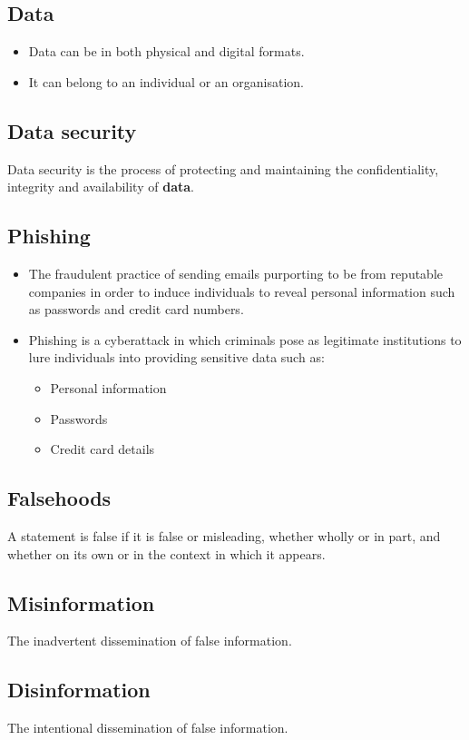 \documentclass[11pt]{article}
\begin{document}
\subsection{Data}
\label{sec:org2c06fa5}
\begin{itemize}
\item Data can be in both physical and digital formats.
\item It can belong to an individual or an organisation.
\end{itemize}
\subsection{Data security}
\label{sec:orgdac249c}
Data security is the process of protecting and maintaining the confidentiality, integrity and availability of \textbf{data}.
\subsection{Phishing}
\label{sec:org4b91ccc}
\begin{itemize}
\item The fraudulent practice of sending emails purporting to be from reputable companies in order to induce individuals to reveal personal information such as passwords and credit card numbers.
\item Phishing is a cyberattack in which criminals pose as legitimate institutions to lure individuals into providing sensitive data such as:
\begin{itemize}
\item Personal information
\item Passwords
\item Credit card details
\end{itemize}
\end{itemize}
\subsection{Falsehoods}
\label{sec:org19b9b7b}
A statement is false if it is false or misleading, whether wholly or in part, and whether on its own or in the context in which it appears.
\subsection{Misinformation}
\label{sec:orge554c08}
The inadvertent dissemination of false information.
\subsection{Disinformation}
\label{sec:orgd5bf5fc}
The intentional dissemination of false information.
\end{document}
